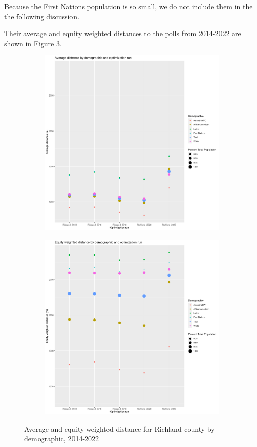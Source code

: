 \documentclass[11pt]{article}
\theoremstyle{remark}
\theoremstyle{definition}
\begin{document}
Because the First Nations population is so small, we do not include them in the the following discussion.

Their average and equity weighted distances to the polls from 2014-2022 are shown in Figure \ref{fig:Richland distance graphs}.

\begin{figure}
	\begin{subfigure}{.8\textwidth}
		\centering
		\includegraphics[width=.8\linewidth]{result analysis/Richland_SC_original_configs/orig_pop_scaled_avg}
		\label{sfig:Richland avg dist}
	\end{subfigure} \newline
	\begin{subfigure}{.8\textwidth}
		\centering
		\includegraphics[width=.8\linewidth]{result analysis/Richland_SC_original_configs/orig_pop_scaled_y_EDE}
		\label{sfig:Richland equity dist}
	\end{subfigure}
	\caption{Average and equity weighted distance for Richland county by demographic, 2014-2022}
	\label{fig:Richland distance graphs}
\end{figure}
\end{document}
